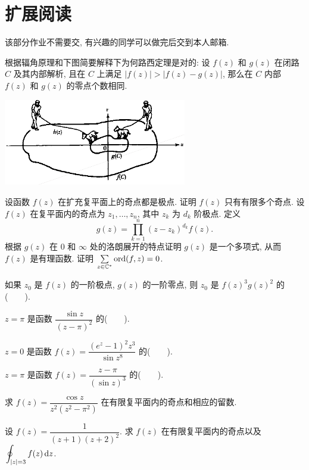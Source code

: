 \section*{扩展阅读}
该部分作业不需要交, 有兴趣的同学可以做完后交到本人邮箱.
\begin{exercise}
	根据辐角原理和下图简要解释下为何路西定理是对的: 设 $f(z)$ 和 $g(z)$ 在闭路 $C$ 及其内部解析, 且在 $C$ 上满足 $|f(z)|>|f(z)-g(z)|$, 那么在 $C$ 内部 $f(z)$ 和 $g(z)$ 的零点个数相同.
	\begin{center}
	\includegraphics[width=8cm]{rouche.png}
	\end{center}
\end{exercise}


\begin{exercise}
	设函数 $f(z)$ 在扩充复平面上的奇点都是极点.
	\subex 证明 $f(z)$ 只有有限多个奇点.
	\subex 设 $f(z)$ 在复平面内的奇点为 $z_1,\dots,z_n$, 其中 $z_k$ 为 $d_k$ 阶极点. 定义
	\[g(z)=\prod_{k=1}^n(z-z_k)^{d_k}f(z).\]
	根据 $g(z)$ 在 $0$ 和 $\infty$ 处的洛朗展开的特点证明 $g(z)$ 是一个多项式, 从而 $f(z)$ 是有理函数.
	\subex 证明 $\sum\limits_{z\in{\mathbb{C}}^*}{\mathrm{ord}}(f,z)=0$.
\end{exercise}







\item 如果 $z_0$ 是 $f(z)$ 的一阶极点, $g(z)$ 的一阶零点, 则 $z_0$ 是 $f(z)^3g(z)^2$ 的(~~~~).
\item $z=\pi$ 是函数 $\dfrac{\sin z}{(z-\pi)^2}$ 的(~~~~).
\item $z=0$ 是函数 $f(z)=\dfrac{(e^z-1)^2z^3}{\sin z^8}$ 的(~~~~).
\item $z=\pi$ 是函数 $f(z)=\dfrac{z-\pi}{(\sin z)^3}$ 的(~~~~).
\item 求 $f(z)=\dfrac{\cos z}{z^2(z^2-\pi^2)}$ 在有限复平面内的奇点和相应的留数.
\item 设 $f(z)=\dfrac{1}{(z+1)(z+2)^2}$. 求 $f(z)$ 在有限复平面内的奇点以及 $\displaystyle\oint_{|z|=3}f(z)\,\mathrm{d} z$.


